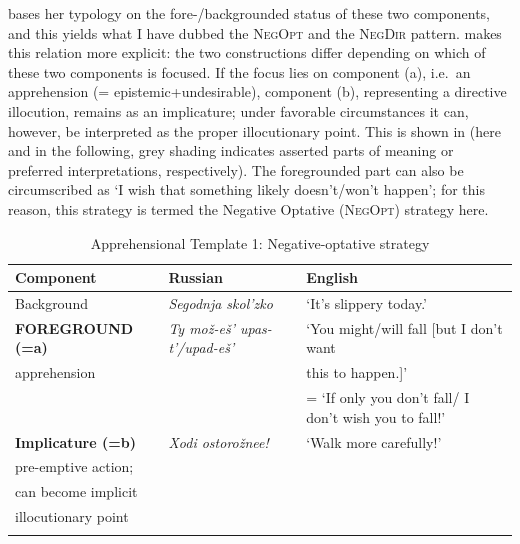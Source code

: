 \documentclass[output=paper,colorlinks,citecolor=brown]{langscibook}
\begin{document}
\largerpage
\citet[30, 51, 58]{Dobrushina2006wiemer} bases her typology on the fore-/backgrounded status of these two components, and this yields what I have dubbed the \textsc{NegOpt} and the \textsc{NegDir} pattern. \citet[61]{Gusev2013} makes this relation more explicit: the two constructions differ depending on which of these two components is focused. If the focus lies on component (a), i.e.\ an apprehension (= epistemic+undesirable), component (b), representing a directive illocution, remains as an implicature; under favorable circumstances it can, however, be interpreted as the proper illocutionary point. This is shown in  (here and in the following, grey shading indicates asserted parts of meaning or preferred interpretations, respectively). The foregrounded part can also be circumscribed as `I wish that something likely doesn't/won't happen'; for this reason, this strategy is termed the Negative Optative (\textsc{NegOpt}) strategy here.

\begin{table}

\caption{Apprehensional Template 1: Negative-optative strategy}
\label{tab:template1}
\begin{tabularx}{\textwidth}{llQ}
\lsptoprule
\textbf{Component} & \textbf{Russian} & \textbf{English} \\ \midrule
Background  & \textit{Segodnja skol'zko} & `It's slippery today.' \\
\midrule
\textbf{FOREGROUND (=a)}  & \textit{Ty mož-eš' upas-t'/upad-eš'} & `You might/will fall {[}but I don't want \\
apprehension &   &  this to happen.{]}' \\
 &  & = `If only you don't fall/\newline
 I don't wish you to fall!' \\
\midrule
\textbf{Implicature (=b)} & \textit{Xodi ostorožnee!} &  ‘Walk more carefully!’ \\
pre-emptive action; & & \\ 
can become implicit & & \\
illocutionary point \\ 
\lspbottomrule
\end{tabularx}
\end{table}
\end{document}
